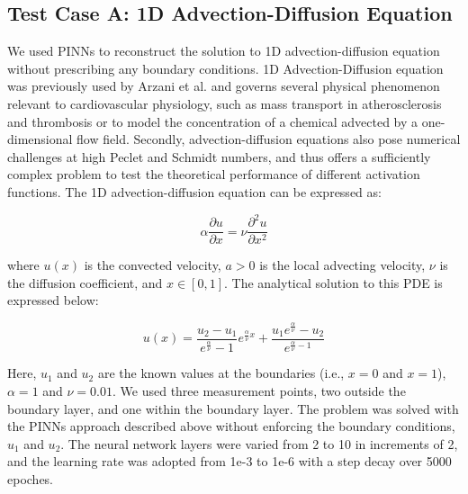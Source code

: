\documentclass[times,twocolumn,final]{elsarticle}
\begin{document}
{%
\subsection{Test Case A: 1D Advection-Diffusion Equation}
We used PINNs to reconstruct the solution to 1D advection-diffusion equation without prescribing any boundary conditions. 1D Advection-Diffusion equation was previously used by Arzani et al. \citep{Arzani2021_PINNs} and governs several physical phenomenon relevant to cardiovascular physiology, such as mass transport in atherosclerosis and thrombosis or to model the concentration of a chemical advected by a one-dimensional flow field. Secondly, advection-diffusion equations also pose numerical challenges at high Peclet and Schmidt numbers, and thus offers a sufficiently complex problem to test the theoretical performance of different activation functions. The 1D advection-diffusion equation can be expressed as:

\begin{equation}
\alpha \frac{\partial u}{\partial x} = \nu \frac{{\partial}^2 u}{\partial x^2}
\end{equation}

where $u(x)$ is the convected velocity, $a > 0$ is the local advecting velocity,  $\nu$ is the diffusion coefficient, and $x \in [0,1]$. The analytical solution to this PDE is expressed below:

\begin{equation}
u(x)=\frac{u_2 - u_1}{e^{\frac{\alpha}{\nu}}-1} e^{\frac{\alpha}{\nu} x} + \frac{ u_{1} e^{\frac{\alpha}{\nu}} - u_2}{e^{\frac{\alpha}{\nu}-1}}
\end{equation}

Here, $u_1$ and $u_2$ are the known values at the boundaries (i.e., $x=0$ and $x=1$), $\alpha=1$ and $\nu=0.01$. We used three measurement points, two outside the boundary layer, and one within the boundary layer. The problem was solved with the PINNs approach described above without enforcing the boundary conditions, $u_1$ and $u_2$. The neural network layers were varied from 2 to 10 in increments of 2, and the learning rate was adopted from 1e-3 to 1e-6 with a step decay over 5000 epoches.

}
\end{document}
